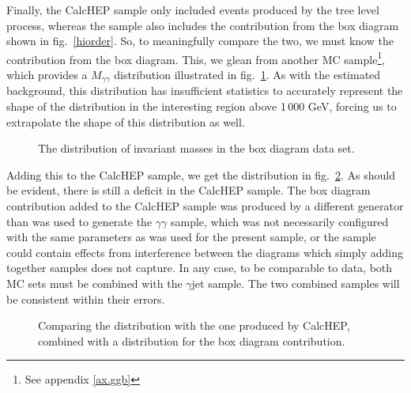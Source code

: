 Finally, the CalcHEP sample only included events produced by the tree level process, whereas the \atlas{} sample also includes the contribution from the box diagram shown in fig.~\ref{hiorder}. So, to meaningfully compare the two, we must know the contribution from the box diagram. This, we glean from another \atlas{} MC sample\footnote{See appendix \ref{ax.ggb}}, which provides a $M_{\gamma\gamma}$ distribution illustrated in fig.~\ref{boxmgg}. As with the estimated background, this distribution has insufficient statistics to accurately represent the shape of the distribution in the interesting region above 1\,000 GeV, forcing us to extrapolate the shape of this distribution as well.

\begin{figure}[htp]
\begin{minipage}[b]{.69\textwidth}
\begin{infilsf} \tiny

\end{infilsf}
\end{minipage}
\begin{minipage}[b]{.3\textwidth}
\caption{The distribution of invariant masses in the \atlas{} box diagram data set.}\label{boxmgg}
\end{minipage}
\end{figure}

Adding this to the CalcHEP sample, we get the distribution in fig.~\ref{ggcomp}. As should be evident, there is still a deficit in the CalcHEP sample. The box diagram contribution added to the CalcHEP sample was produced by a different generator than was used to generate the \atlas{} $\gamma\gamma$ sample, which was not necessarily configured with the same parameters as was used for the present sample, or the \atlas{} sample could contain effects from interference between the diagrams which simply adding together samples does not capture. In any case, to be comparable to data, both MC sets must be combined with the $\gamma$jet sample. The two combined samples will be consistent within their errors.

\begin{figure}[htp]
\begin{minipage}[b]{.69\textwidth}
\begin{infilsf} \tiny

\end{infilsf}
\end{minipage}
\begin{minipage}[b]{.3\textwidth}
\caption{Comparing the \atlas{} distribution with the one produced by CalcHEP, combined with a distribution for the box diagram contribution.}\label{ggcomp}
\end{minipage}
\end{figure}

